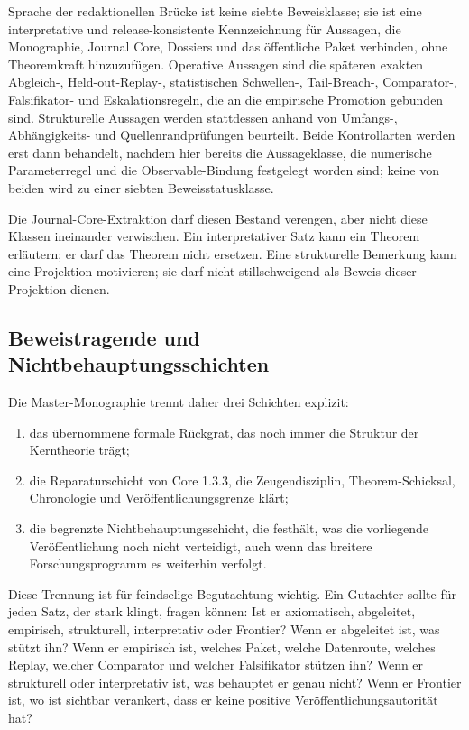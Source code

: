 Sprache der redaktionellen Brücke ist keine siebte Beweisklasse; sie ist eine
interpretative und release-konsistente Kennzeichnung für Aussagen, die
Monographie, Journal Core, Dossiers und das öffentliche Paket verbinden, ohne
Theoremkraft hinzuzufügen.
Operative Aussagen sind die späteren exakten Abgleich-, Held-out-Replay-,
statistischen Schwellen-, Tail-Breach-, Comparator-, Falsifikator- und
Eskalationsregeln, die an die empirische Promotion gebunden sind.
Strukturelle Aussagen werden stattdessen anhand von Umfangs-, Abhängigkeits-
und Quellenrandprüfungen beurteilt. Beide Kontrollarten werden erst dann
behandelt, nachdem hier bereits die Aussageklasse, die numerische
Parameterregel und die Observable-Bindung festgelegt worden sind; keine von
beiden wird zu einer siebten Beweisstatusklasse.

Die Journal-Core-Extraktion darf diesen Bestand verengen, aber nicht diese
Klassen ineinander verwischen.
Ein interpretativer Satz kann ein Theorem erläutern; er darf das Theorem nicht
ersetzen.
Eine strukturelle Bemerkung kann eine Projektion motivieren; sie darf nicht
stillschweigend als Beweis dieser Projektion dienen.

\subsection{Beweistragende und Nichtbehauptungsschichten}

Die Master-Monographie trennt daher drei Schichten explizit:

\begin{enumerate}
\item das übernommene formale Rückgrat, das noch immer die Struktur der
      Kerntheorie trägt;
\item die Reparaturschicht von Core 1.3.3, die Zeugendisziplin, Theorem-Schicksal,
      Chronologie und Veröffentlichungsgrenze klärt;
\item die begrenzte Nichtbehauptungsschicht, die festhält, was die vorliegende
      Veröffentlichung noch nicht verteidigt, auch wenn das breitere
      Forschungsprogramm es weiterhin verfolgt.
\end{enumerate}

Diese Trennung ist für feindselige Begutachtung wichtig.
Ein Gutachter sollte für jeden Satz, der stark klingt, fragen können:
Ist er axiomatisch, abgeleitet, empirisch, strukturell, interpretativ oder
Frontier?
Wenn er abgeleitet ist, was stützt ihn?
Wenn er empirisch ist, welches Paket, welche Datenroute, welches Replay,
welcher Comparator und welcher Falsifikator stützen ihn?
Wenn er strukturell oder interpretativ ist, was behauptet er genau nicht?
Wenn er Frontier ist, wo ist sichtbar verankert, dass er keine positive
Veröffentlichungsautorität hat?


